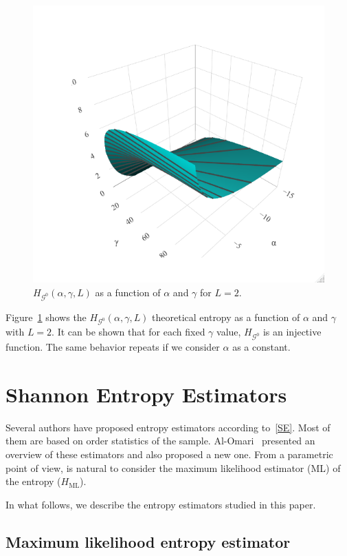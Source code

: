 \documentclass[journal]{IEEEtran}
\begin{document}
\begin{figure}[hbt]
	\centering    
	\includegraphics[width=0.8\linewidth]{../../../Figures/CISS2021/entropiaL2.png}
	\caption{$H_{\mathcal G^0}(\alpha,\gamma,L)$ as a function of $\alpha$ and $\gamma$ for $L=2$.\label{figure:HG0}}
\end{figure}


Figure~\ref{figure:HG0} shows the $H_{\mathcal G^0}(\alpha,\gamma,L)$ theoretical entropy as a function of $\alpha$ and $\gamma$ with $L=2$. 
It can be shown that for each fixed $\gamma$ value, $H_{\mathcal G^0}$ is an injective function. The same behavior repeats if we consider $\alpha$ as a constant.

\section{Shannon Entropy Estimators}

Several authors have proposed entropy estimators according to~\eqref{SE}.
Most of them are based on order statistics of the sample. 
Al-Omari~\cite{AlOmari2016} presented an overview of these estimators and also proposed a new one. 
From a parametric point of view, is natural to consider the maximum likelihood estimator (ML) of the entropy ($H_{\text{ML}}$).

In what follows, we describe the entropy estimators studied in this paper.

\subsection{Maximum likelihood entropy estimator}
\end{document}
